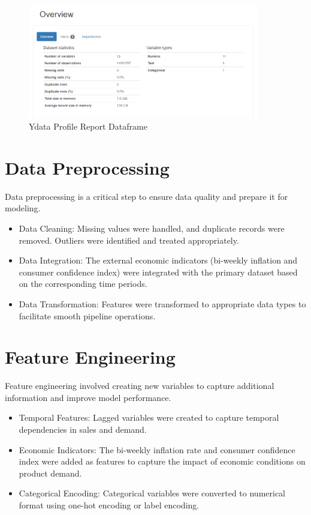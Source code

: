 \documentclass{article}
\begin{document}
\begin{figure}[H] 
\begin{center}
\centering
\includegraphics[width=0.9\textwidth]{images/train_ydata.png}
\caption{Ydata Profile Report Dataframe}
\end{center}
\end{figure}
    

\section{Data Preprocessing}
Data preprocessing is a critical step to ensure data quality and prepare it for modeling.
\begin{itemize}
    \item Data Cleaning: Missing values were handled, and duplicate records were removed. Outliers were identified and treated appropriately.
    \item Data Integration: The external economic indicators (bi-weekly inflation and consumer confidence index) were integrated with the primary dataset based on the corresponding time periods.
    \item Data Transformation: Features were transformed to appropriate data types to facilitate smooth pipeline operations.
\end{itemize}

\section{Feature Engineering}
Feature engineering involved creating new variables to capture additional information and improve model performance.
\begin{itemize}
    \item Temporal Features: Lagged variables were created to capture temporal dependencies in sales and demand.
    \item Economic Indicators: The bi-weekly inflation rate and consumer confidence index were added as features to capture the impact of economic conditions on product demand.
    \item Categorical Encoding: Categorical variables were converted to numerical format using one-hot encoding or label encoding.
\end{itemize}
\end{document}
